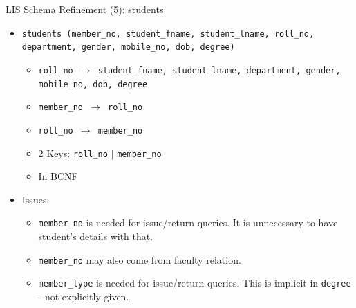\documentclass[aspectratio=169, xcolor=dvipsnames]{beamer}
\begin{document}
\begin{frame}{LIS Schema Refinement (5): students}
    \begin{itemize}
        \item \texttt{students (member\_no, student\_fname, student\_lname, roll\_no, department, gender, mobile\_no, dob, degree)}
        \begin{itemize}
            \item \texttt{roll\_no $\rightarrow$ student\_fname, student\_lname, department, gender, mobile\_no, dob, degree}
            \item \texttt{member\_no $\rightarrow$ roll\_no}
            \item \texttt{roll\_no $\rightarrow$ member\_no}
            \item 2 Keys: \texttt{roll\_no} | \texttt{member\_no}
            \item In BCNF
        \end{itemize}
        \item Issues:
        \begin{itemize}
            \item \texttt{member\_no} is needed for issue/return queries. It is unnecessary to have student's details with that.
            \item \texttt{member\_no} may also come from faculty relation.
            \item \texttt{member\_type} is needed for issue/return queries. This is implicit in \texttt{degree} - not explicitly given.
        \end{itemize}
    \end{itemize}
\end{frame}
\end{document}
